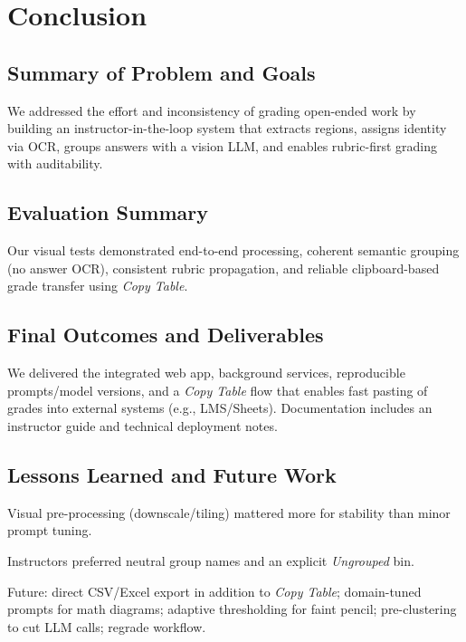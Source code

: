 \documentclass[ms,twoside,print]{nuthesis}
\begin{document}
\chapter{Conclusion}
\section{Summary of Problem and Goals}
We addressed the effort and inconsistency of grading open-ended work by building an instructor-in-the-loop system that extracts regions, assigns identity via OCR, groups answers with a vision LLM, and enables rubric-first grading with auditability.

\section{Evaluation Summary}
Our visual tests demonstrated end-to-end processing, coherent semantic grouping (no answer OCR), consistent rubric propagation, and reliable clipboard-based grade transfer using \emph{Copy Table}.

\section{Final Outcomes and Deliverables}
We delivered the integrated web app, background services, reproducible prompts/model versions, and a \emph{Copy Table} flow that enables fast pasting of grades into external systems (e.g., LMS/Sheets). Documentation includes an instructor guide and technical deployment notes.

\section{Lessons Learned and Future Work}
\begin{compactitem}
  \item Visual pre-processing (downscale/tiling) mattered more for stability than minor prompt tuning.
  \item Instructors preferred neutral group names and an explicit \emph{Ungrouped} bin.
  \item Future: direct CSV/Excel export in addition to \emph{Copy Table}; domain-tuned prompts for math diagrams; adaptive thresholding for faint pencil; pre-clustering to cut LLM calls; regrade workflow.
\end{compactitem}

\appendix
\end{document}
